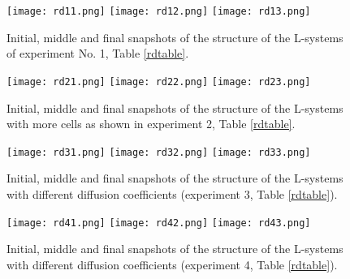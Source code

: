 \begin{figure}
\begin{center}
\texttt{[image: rd11.png]}
\texttt{[image: rd12.png]}
\texttt{[image: rd13.png]}
\end{center}
\caption{Initial, middle and final snapshots of the structure of the L-systems of experiment No. 1, Table \ref{rdtable}.}
\label{rd1}
\end{figure}

\begin{figure}
\begin{center}
\texttt{[image: rd21.png]}
\texttt{[image: rd22.png]}
\texttt{[image: rd23.png]}
\end{center}
\caption{Initial, middle and final snapshots of the structure of the L-systems with more cells as shown in experiment 2, Table \ref{rdtable}.}
\label{rd2}
\end{figure}

\begin{figure}
\begin{center}
\texttt{[image: rd31.png]}
\texttt{[image: rd32.png]}
\texttt{[image: rd33.png]}
\end{center}
\caption{Initial, middle and final snapshots of the structure of the L-systems with different diffusion coefficients (experiment 3, Table \ref{rdtable}).}
\label{rd3}
\end{figure}

\begin{figure}
\begin{center}
\texttt{[image: rd41.png]}
\texttt{[image: rd42.png]}
\texttt{[image: rd43.png]}
\end{center}
\caption{Initial, middle and final snapshots of the structure of the L-systems with different diffusion coefficients (experiment 4, Table \ref{rdtable}).}
\label{rd4}
\end{figure}

